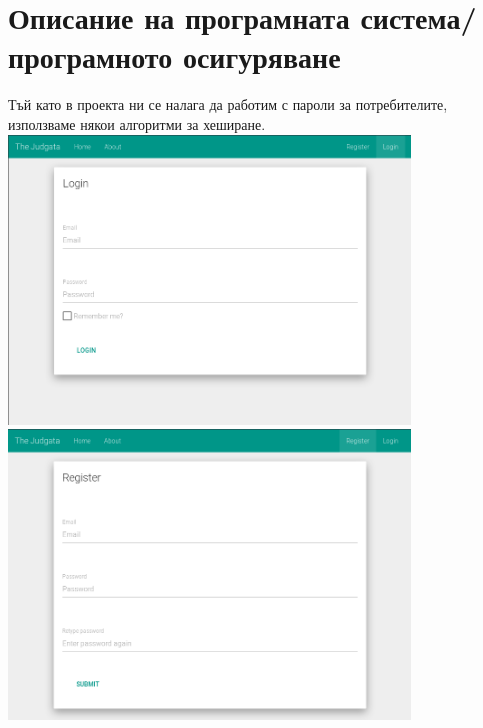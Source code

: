 \documentclass[12pt]{article}
\begin{document}
	\section{Описание на програмната система/програмното осигуряване} 
	Тъй като в проекта ни се налага да работим с пароли за потребителите, използваме някои алгоритми за хеширане. \\ \vspace {0.5cm}
	\includegraphics[width=0.80\textwidth]{login} \\ \vspace {0.5cm}
	\includegraphics[width=0.80\textwidth]{register}
	\newpage
\end{document}

